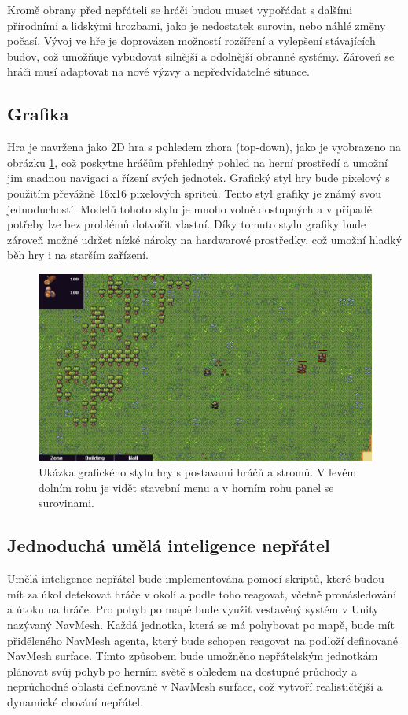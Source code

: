 Kromě obrany před nepřáteli se hráči budou muset vypořádat s dalšími přírodními a lidskými hrozbami, jako je nedostatek surovin, nebo náhlé změny počasí. Vývoj ve hře je doprovázen možností rozšíření a vylepšení stávajících budov, což umožňuje vybudovat silnější a odolnější obranné systémy. Zároveň se hráči musí adaptovat na nové výzvy a nepředvídatelné situace.
\newpage 

\subsection{Grafika}
Hra je navržena jako 2D hra s pohledem zhora (top-down), jako je vyobrazeno na obrázku \ref{GraphicStyle}, což poskytne hráčům přehledný pohled na herní prostředí a umožní jim snadnou navigaci a řízení svých jednotek. Grafický styl hry bude pixelový s použitím převážně 16x16 pixelových spriteů. Tento styl grafiky je známý svou jednoduchostí. Modelů tohoto stylu je mnoho volně dostupných a v případě potřeby lze bez problémů dotvořit vlastní. Díky tomuto stylu grafiky bude zároveň možné udržet nízké nároky na hardwarové prostředky, což umožní hladký běh hry i na starším zařízení.

\begin{figure}[H]
	\centering
	\includegraphics[scale=0.55]{obrazky-figures/GraphicStyle.png}
	\caption{Ukázka grafického stylu hry s postavami hráčů a stromů. V levém dolním rohu je vidět stavební menu a v horním rohu panel se surovinami.}
	\label{GraphicStyle}
\end{figure}

\subsection{Jednoduchá umělá inteligence nepřátel}
Umělá inteligence nepřátel bude implementována pomocí skriptů, které budou mít za úkol detekovat hráče v okolí a podle toho reagovat, včetně pronásledování a útoku na hráče. Pro pohyb po mapě bude využit vestavěný systém v Unity nazývaný NavMesh. Každá jednotka, která se má pohybovat po mapě, bude mít přiděleného NavMesh agenta, který bude schopen reagovat na podloží definované NavMesh surface. Tímto způsobem bude umožněno nepřátelským jednotkám plánovat svůj pohyb po herním světě s ohledem na dostupné průchody a neprůchodné oblasti definované v NavMesh surface, což vytvoří realističtější a dynamické chování nepřátel.

